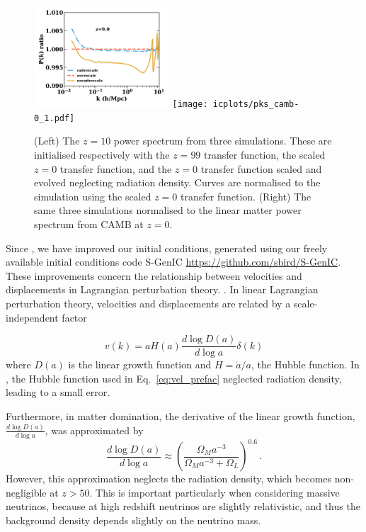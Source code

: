 \documentclass[useAMS, usenatbib]{mnras}
\begin{document}
\begin{figure}
\includegraphics[width=0.45\textwidth]{icplots/pks_rel-0_1.pdf}
\texttt{[image: icplots/pks\_camb-0\_1.pdf]}
  \caption{(Left) The $z=10$ power spectrum from three simulations.
  These are initialised respectively with the $z=99$ transfer function,
  the scaled $z=0$ transfer function, and the $z=0$ transfer function
  scaled and evolved neglecting radiation density.
  Curves are normalised to the simulation using the scaled $z=0$ transfer function.
  (Right) The same three simulations normalised to the linear matter
  power spectrum from CAMB at $z=0$.}
  \label{fig:rescaling10}
\end{figure}


Since \cite{AHB}, we have improved our initial conditions, generated
using our freely available initial conditions code
S-GenIC \url{https://github.com/sbird/S-GenIC}. These improvements concern
the relationship between velocities and displacements in Lagrangian perturbation theory.
\citep{Zeldovich_1970, Scoccimarro_1998}. In linear Lagrangian perturbation theory,
velocities and displacements are related by a scale-independent factor

\begin{equation}
v(k) = a H(a) \frac{d \log D(a)}{d \log a} \delta(k)
\label{eq:vel_prefac}
\end{equation}
where $D(a)$ is the linear growth function and $H = \dot{a}/a$, the Hubble function.
In \cite{AHB}, the Hubble function used in Eq.~\ref{eq:vel_prefac}
neglected radiation density, leading to a small error.

Furthermore, in matter domination, the derivative of the linear growth function,
$\frac{d \log D(a)}{d \log a}$, was approximated by \citep{Bouchet:1995}
\begin{equation}
\frac{d \log D(a)}{d \log a} \approx \left(\frac{\Omega_M a^{-3}}{\Omega_M  a^{-3} + \Omega_L}\right)^{0.6}\,.
\end{equation}
However, this approximation neglects the radiation density, which becomes
non-negligible at $z > 50$. This is important particularly when considering
massive neutrinos, because at high redshift neutrinos are slightly relativistic,
and thus the background density depends slightly on the neutrino mass.
\end{document}
